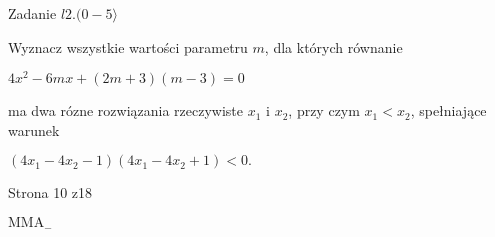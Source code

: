 \documentclass[a4paper,12pt]{article}
\begin{document}
Zadanie $ l2.(0-5\rangle$

Wyznacz wszystkie wartości parametru $m$, dla których równanie

$4x^{2}-6mx+(2m+3)(m-3)=0$

ma dwa rózne rozwiązania rzeczywiste $x_{1}$ i $x_{2}$, przy czym $x_{1}<x_{2}$, spełniające warunek

$(4x_{1}-4x_{2}-1)(4x_{1}-4x_{2}+1)<0.$

Strona 10 z18

$\mathrm{M}\mathrm{M}\mathrm{A}_{-}$
\end{document}

